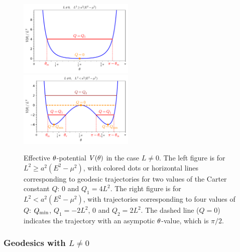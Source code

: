 \begin{figure}
\centerline{\includegraphics[width=0.49\textwidth]{gek_th_pot_high_L.pdf}
\ \includegraphics[width=0.49\textwidth]{gek_th_pot_low_L.pdf}}
\caption[]{\label{f:gek:th_pot_L_non0} \footnotesize
Effective $\theta$-potential $V(\theta)$ in the case $L\neq0$.
The left figure is for $L^2 \geq a^2(E^2 - \mu^2)$,
with colored dots or horizontal lines
corresponding to geodesic trajectories for
two values of the Carter constant $Q$: $0$ and $Q_1= 4 L^2$.
The right figure is for $L^2 < a^2(E^2 - \mu^2)$, with trajectories corresponding
to four values of $Q$: $Q_{\rm min}$, $Q_1 = - 2 L^2$, $0$ and $Q_2 = 2 L^2$.
The dashed line ($Q=0$)
indicates the trajectory with an asympotic $\theta$-value, which is $\pi/2$.
}
\end{figure}


\subsubsection{Geodesics with $L\not=0$}

